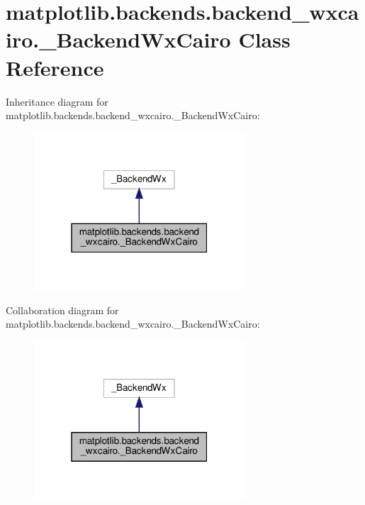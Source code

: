 \hypertarget{classmatplotlib_1_1backends_1_1backend__wxcairo_1_1__BackendWxCairo}{}\section{matplotlib.\+backends.\+backend\+\_\+wxcairo.\+\_\+\+Backend\+Wx\+Cairo Class Reference}
\label{classmatplotlib_1_1backends_1_1backend__wxcairo_1_1__BackendWxCairo}


Inheritance diagram for matplotlib.\+backends.\+backend\+\_\+wxcairo.\+\_\+\+Backend\+Wx\+Cairo\+:
\nopagebreak
\begin{figure}[H]
\begin{center}
\leavevmode
\includegraphics[width=223pt]{classmatplotlib_1_1backends_1_1backend__wxcairo_1_1__BackendWxCairo__inherit__graph}
\end{center}
\end{figure}


Collaboration diagram for matplotlib.\+backends.\+backend\+\_\+wxcairo.\+\_\+\+Backend\+Wx\+Cairo\+:
\nopagebreak
\begin{figure}[H]
\begin{center}
\leavevmode
\includegraphics[width=223pt]{classmatplotlib_1_1backends_1_1backend__wxcairo_1_1__BackendWxCairo__coll__graph}
\end{center}
\end{figure}
